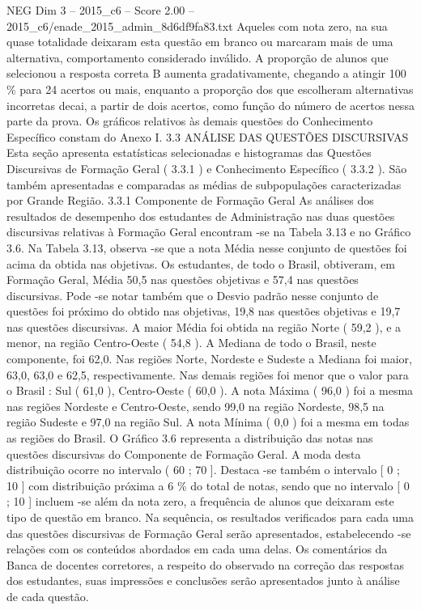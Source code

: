 \begin{textsample}{NEG Dim 3 – 2015\_c6 – Score 2.00 – 2015\_c6/enade\_2015\_admin\_8d6df9fa83.txt}
Aqueles com nota zero, na sua quase totalidade deixaram esta questão em branco ou marcaram mais de uma alternativa, comportamento considerado inválido.
A proporção de alunos que selecionou a resposta correta B aumenta gradativamente, chegando a atingir 100 \% para 24 acertos ou mais, enquanto a proporção dos que escolheram alternativas incorretas decai, a partir de dois acertos, como função do número de acertos nessa parte da prova.
Os gráficos relativos às demais questões do Conhecimento Específico constam do Anexo I. 3.3 ANÁLISE DAS QUESTÕES DISCURSIVAS Esta seção apresenta estatísticas selecionadas e histogramas das Questões Discursivas de Formação Geral ( 3.3.1 ) e Conhecimento Específico ( 3.3.2 ).
São também apresentadas e comparadas as médias de subpopulações caracterizadas por Grande Região. 3.3.1 Componente de Formação Geral As análises dos resultados de desempenho dos estudantes de Administração nas duas questões discursivas relativas à Formação Geral encontram -se na Tabela 3.13 e no Gráfico 3.6.
Na Tabela 3.13, observa -se que a nota Média nesse conjunto de questões foi acima da obtida nas objetivas.
Os estudantes, de todo o Brasil, obtiveram, em Formação Geral, Média 50,5 nas questões objetivas e 57,4 nas questões discursivas.
Pode -se notar também que o Desvio padrão nesse conjunto de questões foi próximo do obtido nas objetivas, 19,8 nas questões objetivas e 19,7 nas questões discursivas.
A maior Média foi obtida na região Norte ( 59,2 ), e a menor, na região Centro-Oeste ( 54,8 ).
A Mediana de todo o Brasil, neste componente, foi 62,0.
Nas regiões Norte, Nordeste e Sudeste a Mediana foi maior, 63,0, 63,0 e 62,5, respectivamente.
Nas demais regiões foi menor que o valor para o Brasil : Sul ( 61,0 ), Centro-Oeste ( 60,0 ).
A nota Máxima ( 96,0 ) foi a mesma nas regiões Nordeste e Centro-Oeste, sendo 99,0 na região Nordeste, 98,5 na região Sudeste e 97,0 na região Sul.
A nota Mínima ( 0,0 ) foi a mesma em todas as regiões do Brasil.
O Gráfico 3.6 representa a distribuição das notas nas questões discursivas do Componente de Formação Geral.
A moda desta distribuição ocorre no intervalo ( 60 ; 70 ].
Destaca -se também o intervalo [ 0 ; 10 ] com distribuição próxima a 6 \% do total de notas, sendo que no intervalo [ 0 ; 10 ] incluem -se além da nota zero, a frequência de alunos que deixaram este tipo de questão em branco.
Na sequência, os resultados verificados para cada uma das questões discursivas de Formação Geral serão apresentados, estabelecendo -se relações com os conteúdos abordados em cada uma delas.
Os comentários da Banca de docentes corretores, a respeito do observado na correção das respostas dos estudantes, suas impressões e conclusões serão apresentados junto à análise de cada questão.

\end{textsample}
